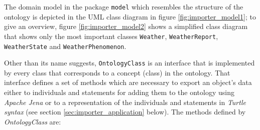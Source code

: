 The domain model in the package \texttt{model} which resembles the structure of the \thinkhomeweather ontology is depicted in the UML class diagram in figure \ref{fig:importer_model1}; to give an overview, figure \ref{fig:importer_model2} shows a simplified class diagram that shows only the most important classes \texttt{Weather}, \texttt{WeatherReport}, \texttt{WeatherState} and \texttt{WeatherPhenomenon}.

Other than its name suggests, \texttt{OntologyClass} is an interface that is implemented by every class that corresponds to a concept (class) in the ontology. That interface defines a set of methods which are necessary to export an object's data either to individuals and statements for adding them to the ontology using \emph{Apache Jena} or to a representation of the individuals and statements in \emph{Turtle syntax} (see section \ref{sec:importer_application} below). The methods defined by \emph{OntologyClass} are:
